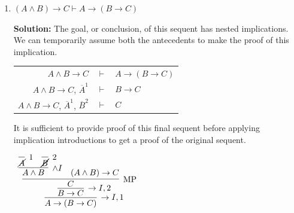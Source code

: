 \documentclass[11pt]{report}
\newcommand{\temp}[2]{{\overline{#2}}^{#1}}
\begin{document}
\begin{enumerate}
\begin{enumerate}
		This is proved by another $\lor$ introduction step. 

		\begin{center}
			$\begin{array}{c}
				\infer[\lor I_{L}]{B \lor A}
					{\temp{2}{B}}
			\end{array}$
		\end{center}

		With these separate cases done we can combine them with $\lor$ elimination to prove the original sequent:

		\begin{center}
			$\begin{array}{c}
				\infer[\lor E]{B \lor A}
					{A \lor B
						&
						\infer[\to I,1]{A \to (B \lor A)}
							{\infer[\lor I_{R}]{B \lor A}
								{\temp{1}{A}}}
						&
						\infer[\to I,2]{B \to (B \lor A)}
							{\infer[\lor I_{L}]{B \lor A}
								{\temp{2}{B}}}}				
			\end{array}$

		\end{center}		
		
		\newpage
		\item $(A \land B) \rightarrow C \vdash  A\rightarrow (B \rightarrow C)$
		
		\vspace{5mm}
		\textbf{Solution:}
		The goal, or conclusion, of this sequent has nested implications. We can temporarily assume both the antecedents to make the proof of this implication. 

		\begin{center}
			\begin{tabular}{r c l}
				$A \land B \to C$ & $\vdash$ & $A \to (B \to C)$ \\
				$A \land B \to C$, $\temp{1}{A}$ & $\vdash$ & $B \to C$ \\
				$A \land B \to C$, $\temp{1}{A}$, $\temp{2}{B}$ & $\vdash$ & $C$ \\
			\end{tabular}
		\end{center}

		It is sufficient to provide proof of this final sequent before applying implication introductions to get a proof of the original sequent.

		\begin{center}
			$\begin{array}{c}
				\infer[\to I,1]{A \to (B \to C)}
					{\infer[\to I,2]{B \to C}
						{\infer[\MP]{C}
							{\infer[\land I]{A \land B}
								{\infer[1]{\cancel{A}}{} & \infer[2]{\cancel{B}}{}}
							&							
							(A \land B) \to C}}}
			\end{array}$
		\end{center}
		

\end{enumerate}
\end{enumerate}
\end{document}
